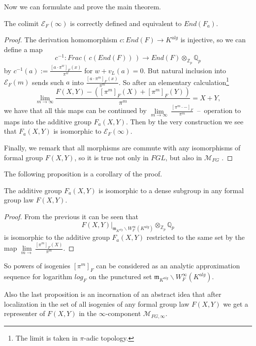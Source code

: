 \documentclass[
11pt,%
tightenlines,%
twoside,%
onecolumn,%
nofloats,%
nobibnotes,%
nofootinbib,%
superscriptaddress,%
noshowpacs,%
centertags]%
{revtex4}
\begin{document}
Now we can formulate and prove the main theorem.

\begin{theorem}
The colimit $\mathcal{E}_{F}(\infty)$ is correctly defined and equivalent to $End(F_{a})$.
\end{theorem}
\begin{proof}
The derivation homomorphism $c: End(F) \rightarrow K^{alg}$ is injective, so we can define a map
$$c^{-1}: Frac(\,c(End(F))\,) \rightarrow End(F)\otimes_{\mathbb{Z}_{p}}\mathbb{Q}_{p}$$
by $c^{-1}(a):= \frac{[a\cdot \pi^{w}]_{F}(x)}{\pi^{w}}$ for $w + v_{L}(a) = 0$. But natural inclusion into $\mathcal{E}_{F}(m)$ sends such $a$ into $\frac{[a\cdot \pi^{m}]_{F}(x)}{\pi^{m}}$. So after an elementary calculation\footnote{The limit is taken in $\pi$-adic topology.}
$$\lim_{m \rightarrow \infty}\frac{F(X,Y) - \left([\pi^{m}]_{F}(X) + [\pi^{m}]_{F}(Y)\right)}{\pi^{m}} = X+Y,$$
we have that all this maps can be continued by $\lim\limits_{m\rightarrow \infty}~\frac{[\pi^{m}\cdot - ]_F}{\pi^m}$~--~operation to maps into the additive group $F_{a}(X,Y)$. Then by the very construction we see that $F_{a}(X,Y)$ is isomorphic  to $\mathcal{E}_{F}(\infty)$.

Finally, we remark that all morphisms are commute with any isomorphisms of formal group $F(X,Y)$, so it is true not only in $FGL$, but also in $\mathcal{M}_{FG}$ .
\end{proof}

The following proposition is a corollary of the proof.

\begin{corollary}
The additive group $F_{a}(X,Y)$ is isomorphic to a dense subgroup in any formal group law $F(X,Y)$.
\end{corollary}
\begin{proof}
From the previous it can be seen that $$F(X,Y)|_{\mathfrak{m}_{K^{alg}}\backslash W_{F}^{\infty}(K^{alg})}\otimes_{\mathbb{Z}_{p}}\mathbb{Q}_{p}$$ is isomorphic to the additive group $F_{a}(X,Y)$ restricted to the same set by the map $\lim\limits_{m\rightarrow} \frac{[\pi^m]_{F}(X)}{\pi^{m}}$.
\end{proof}

So powers of isogenies $[\pi^{m}]_{F}$ can be considered as an analytic approximation sequence for logarithm $log_{F}$ on the punctured set $\mathfrak{m}_{K^{alg}}\backslash W_{F}^{\infty}(K^{alg})$.

Also the last proposition is an incornation of an abstract idea that after localization in the set of all isogenies of any formal group law $F(X,Y)$ we get a representer of $F(X,Y)$ in the $\infty$-component $\mathcal{M}_{FG, \infty}$.
\end{document}
